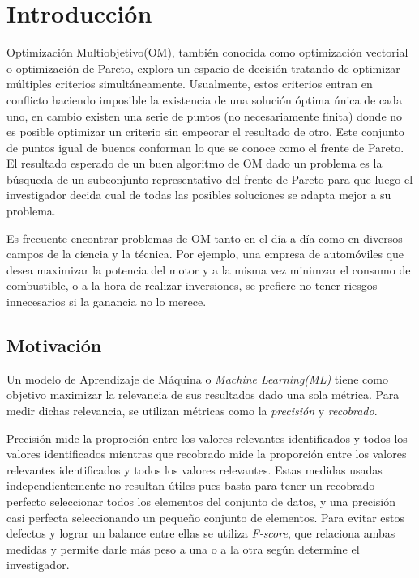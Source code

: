 \chapter*{Introducción}\label{chapter:introduction}

Optimizaci\'on Multiobjetivo(OM), tambi\'en conocida como optimizaci\'on vectorial o optimizaci\'on de Pareto, explora un espacio de decisi\'on tratando de optimizar m\'ultiples criterios simult\'aneamente. Usualmente, estos criterios entran en conflicto haciendo imposible la existencia de una soluci\'on \'optima \'unica de cada uno, en cambio existen una serie de puntos (no necesariamente finita) donde no es posible optimizar un criterio sin empeorar el resultado de otro. Este conjunto de puntos igual de buenos conforman lo que se conoce como el frente de Pareto. El resultado esperado de un buen algoritmo de OM dado un problema es la b\'usqueda de un subconjunto representativo del frente de Pareto para que luego el investigador decida cual de todas las posibles soluciones se adapta mejor a su problema.

Es frecuente encontrar problemas de OM tanto en el d\'ia a d\'ia como en diversos campos de la ciencia y la t\'ecnica. Por ejemplo, una empresa de autom\'oviles que desea maximizar la potencia del motor y a la misma vez minimzar el consumo de combustible, o a la hora de realizar inversiones, se prefiere no tener riesgos innecesarios si la ganancia no lo merece.

\section*{Motivaci\'on}

Un modelo de Aprendizaje de M\'aquina o \textit{Machine Learning(ML)}  tiene como objetivo maximizar la relevancia de sus resultados dado una sola m\'etrica. Para medir dichas relevancia, se utilizan m\'etricas como la \textit{precisi\'on} y \textit{recobrado}. 

Precisi\'on mide la proproci\'on entre los valores relevantes identificados y todos los valores identificados mientras que recobrado mide la proporci\'on entre los valores relevantes identificados y todos los valores relevantes. Estas medidas usadas independientemente no resultan \'utiles pues basta para tener un recobrado perfecto seleccionar todos los elementos del conjunto de datos, y una precisi\'on casi perfecta seleccionando un pequeño conjunto de elementos. Para evitar estos defectos y lograr un balance entre ellas se utiliza \textit{F-score}, que relaciona ambas medidas y permite darle m\'as peso a una o a la otra seg\'un determine el investigador.

